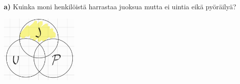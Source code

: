 \documentclass{article}
\begin{document}
\begin{itemize}
    \item[\textbf{a)}] Kuinka moni henkilöistä harrastaa juoksua mutta ei uintia eikä pyöräilyä?
        
        
        
    \begin{center}
        \includegraphics[width=0.3\textwidth]{harj5teht1venn.jpg}
    \end{center}
    

\end{itemize}
\end{document}
